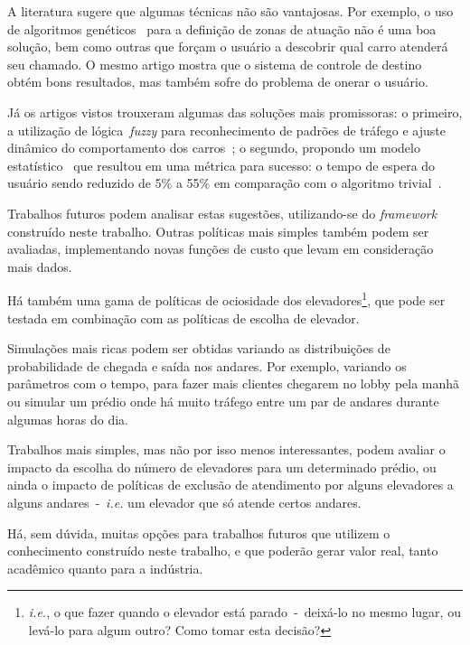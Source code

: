 A literatura sugere que algumas técnicas não são vantajosas. Por exemplo, o uso
de algoritmos genéticos~\cite{KOEHLEROTTIGER02} para a definição de zonas de
atuação não é uma boa solução, bem como outras que forçam o usuário a descobrir
qual carro atenderá seu chamado. O mesmo artigo mostra que o sistema de controle
de destino~\cite{KOEHLEROTTIGER02} obtém bons resultados, mas também sofre do
problema de onerar o usuário.

Já os artigos vistos trouxeram algumas das soluções mais promissoras: o
primeiro, a utilização de lógica~\textit{fuzzy} para reconhecimento de padrões
de tráfego e ajuste dinâmico do comportamento dos carros~\cite{marja97}; o
segundo, propondo um modelo estatístico~\cite{DBLP:journals/corr/abs-1212-2499}
que resultou em uma métrica para sucesso: o tempo de espera do usuário sendo
reduzido de 5\% a 55\% em comparação com o algoritmo
trivial~\cite{DBLP:journals/corr/abs-1212-2499}.

Trabalhos futuros podem analisar estas sugestões, utilizando-se do
\textit{framework} construído neste trabalho. Outras políticas mais simples
também podem ser avaliadas, implementando novas funções de custo que levam em
consideração mais dados.

Há também uma gama de políticas de ociosidade dos
elevadores\footnote{\textit{i.e.}, o que fazer quando o elevador está
  parado~-~deixá-lo no mesmo lugar, ou levá-lo para algum outro? Como tomar esta
decisão?}, que pode ser testada em combinação com as políticas de escolha de elevador.

Simulações mais ricas podem ser obtidas variando as distribuições de
probabilidade de chegada e saída nos andares. Por exemplo, variando os
parâmetros com o tempo, para fazer mais clientes chegarem no lobby pela manhã ou
simular um prédio onde há muito tráfego entre um par de andares durante algumas
horas do dia.

Trabalhos mais simples, mas não por isso menos interessantes, podem avaliar o
impacto da escolha do número de elevadores para um determinado prédio, ou ainda
o impacto de políticas de exclusão de atendimento por alguns elevadores a alguns
andares~-~\textit{i.e.} um elevador que só atende certos andares.

Há, sem dúvida, muitas opções para trabalhos futuros que utilizem o conhecimento
construído neste trabalho, e que poderão gerar valor real, tanto acadêmico
quanto para a indústria.
